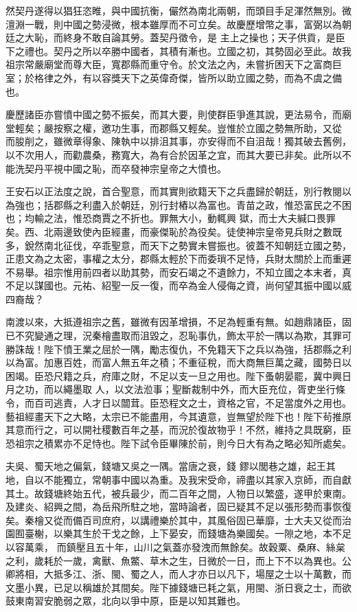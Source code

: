 \begin{pinyinscope}
 然契丹遂得以猖狂恣睢，與中國抗衡，儼然為南北兩朝，而頭目手足渾然無別。微澶淵一戰，則中國之勢浸微，根本雖厚而不可立矣。故慶歷增幣之事，富弼以為朝廷之大恥，而終身不敢自論其勞。蓋契丹徵令，是
 主上之操也；天子供貢，是臣下之禮也。契丹之所以卒勝中國者，其積有漸也。立國之初，其勢固必至此。故我祖宗常嚴廟堂而尊大臣，寬郡縣而重守令。於文法之內，未嘗折困天下之富商巨室；於格律之外，有以容獎天下之英偉奇傑，皆所以助立國之勢，而為不虞之備也。



 慶歷諸臣亦嘗憤中國之勢不振矣，而其大要，則使群臣爭進其說，更法易令，而廟堂輕矣；嚴按察之權，邀功生事，而郡縣又輕矣。豈惟於立國之勢無所助，又從
 而朘削之，雖微章得象、陳執中以排沮其事，亦安得而不自沮哉！獨其破去舊例，以不次用人，而勸農桑，務寬大，為有合於因革之宜，而其大要已非矣。此所以不能洗契丹平視中國之恥，而卒發神宗皇帝之大憤也。



 王安石以正法度之說，首合聖意，而其實則欲籍天下之兵盡歸於朝廷，別行教閱以為強也；括郡縣之利盡入於朝廷，別行封樁以為富也。青苗之政，惟恐富民之不困也；均輸之法，惟恐商賈之不折也。罪無大小，動輒興
 獄，而士大夫緘口畏罪矣。西、北兩邊致使內臣經畫，而豪傑恥於為役矣。徒使神宗皇帝見兵財之數既多，銳然南北征伐，卒乖聖意，而天下之勢實未嘗振也。彼蓋不知朝廷立國之勢，正患文為之太密，事權之太分，郡縣太輕於下而委瑣不足恃，兵財太關於上而重遲不易舉。祖宗惟用前四者以助其勢，而安石竭之不遺餘力，不知立國之本末者，真不足以謀國也。元祐、紹聖一反一復，而卒為金人侵侮之資，尚何望其振中國以威
 四裔哉？



 南渡以來，大抵遵祖宗之舊，雖微有因革增損，不足為輕重有無。如趙鼎諸臣，固已不究變通之理，況秦檜盡取而沮毀之，忍恥事仇，飾太平於一隅以為欺，其罪可勝誅哉！陛下憤王業之屈於一隅，勵志復仇，不免籍天下之兵以為強，括郡縣之利以為富。加惠百姓，而富人無五年之積；不重征稅，而大商無巨萬之藏，國勢日以困竭。臣恐尺籍之兵，府庫之財，不足以支一旦之用也。陛下蚤朝晏罷，冀中興日月之功，而以繩墨取
 人，以文法涖事；聖斷裁制中外，而大臣充位，胥吏坐行條令，而百司逃責，人才日以闒茸。臣恐程文之士，資格之官，不足當度外之用也。藝祖經畫天下之大略，太宗已不能盡用，今其遺意，豈無望於陛下也！陛下茍推原其意而行之，可以開社稷數百年之基，而況於復故物乎！不然，維持之具既窮，臣恐祖宗之積累亦不足恃也。陛下試令臣畢陳於前，則今日大有為之略必知所處矣。



 夫吳、蜀天地之偏氣，錢塘又吳之一隅。當唐之衰，錢
 鏐以閭巷之雄，起王其地，自以不能獨立，常朝事中國以為重。及我宋受命，禘盡以其家入京師，而自獻其土。故錢塘終始五代，被兵最少，而二百年之間，人物日以繁盛，遂甲於東南。及建炎、紹興之間，為岳飛所駐之地，當時論者，固已疑其不足以張形勢而事恢復矣。秦檜又從而備百司庶府，以講禮樂於其中，其風俗固已華靡，士大夫又從而治園囿臺榭，以樂其生於干戈之餘，上下晏安，而錢塘為樂國矣。一隙之地，本不足以容萬乘，
 而鎮壓且五十年，山川之氣蓋亦發洩而無餘矣。故穀粟、桑麻、絲枲之利，歲耗於一歲，禽獸、魚鱉、草木之生，日微於一日，而上下不以為異也。公卿將相，大抵多江、浙、閩、蜀之人，而人才亦日以凡下，場屋之士以十萬數，而文墨小異，已足以稱雄於其間矣。陛下據錢塘已耗之氣，用閩、浙日衰之士，而欲鼓東南習安脆弱之眾，北向以爭中原，臣是以知其難也。




\end{pinyinscope}
